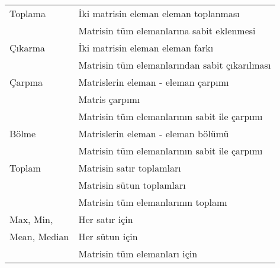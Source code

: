 \begin{longtable}{p{80pt} p{250pt}}
\hline \hline
\endlastfoot
 Toplama 								& İki matrisin eleman eleman toplanması 											\\%
 												& Matrisin tüm elemanlarına sabit eklenmesi										\\%
 Çıkarma 								& İki matrisin eleman eleman farkı 														\\%
 												& Matrisin tüm elemanlarından sabit çıkarılması 							\\%
 Çarpma									& Matrislerin eleman - eleman çarpımı 												\\%
 												& Matris çarpımı 																							\\%
 												& Matrisin tüm elemanlarının sabit ile çarpımı				 				\\%
 Bölme									& Matrislerin eleman - eleman bölümü 													\\%
 												& Matrisin tüm elemanlarının sabit ile çarpımı				 				\\%
 Toplam									& Matrisin satır toplamları 																	\\%
 												& Matrisin sütun toplamları				 														\\%
 												& Matrisin tüm elemanlarının toplamı 													\\%
 Max, Min,  						& Her satır için																							\\%
 Mean, Median						& Her sütun için																							\\%
 												& Matrisin tüm elemanları için																\\%

\end{longtable}
